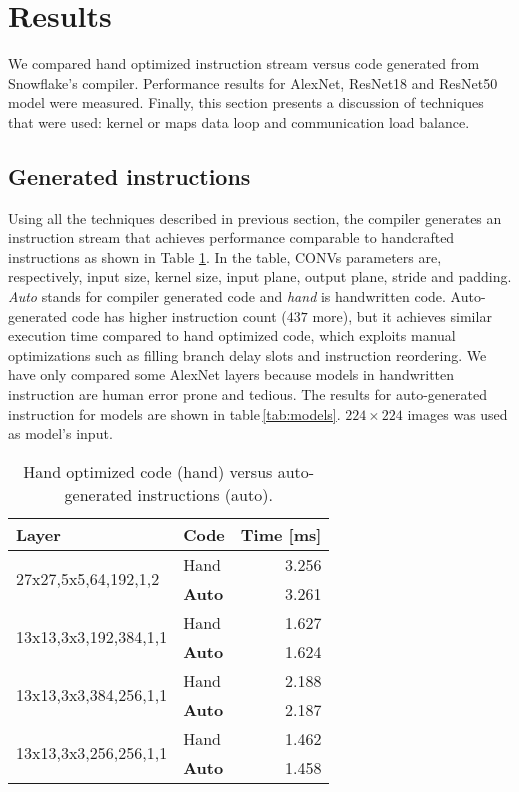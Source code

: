 \documentclass{sig-alternate}
\begin{document}
\section{Results}
We compared hand optimized instruction stream versus code generated from Snowflake's compiler. Performance results for AlexNet, ResNet18 and ResNet50 model were measured. Finally, this section presents a discussion of techniques that were used: kernel or maps data loop and communication load balance.

\subsection{Generated instructions}
Using all the techniques described in previous section, the compiler generates an instruction stream that achieves performance comparable to handcrafted instructions as shown in Table \ref{tab:hand}. In the table, CONVs parameters are, respectively, input size, kernel size, input plane, output plane, stride and padding. \emph{Auto} stands for compiler generated code and \emph{hand} is handwritten code. Auto-generated code has higher instruction count ($437$ more), but it achieves similar execution time compared to hand optimized code, which exploits manual optimizations such as filling branch delay slots and instruction reordering. We have only compared some AlexNet layers because models in handwritten instruction are human error prone and tedious. The results for auto-generated instruction for models are shown in table\,\ref{tab:models}. $224\times224$ images was used as model's input.

\begin{table}[h]
\centering
\caption{Hand optimized code (hand) versus auto-generated instructions (auto).}
\label{tab:hand}
\begin{tabular}{|l|l|r|}
\hline
Layer & Code & Time {[}ms{]} \\ \hline
\multirow{2}{*}{27x27,5x5,64,192,1,2} & Hand & 3.256 \\ \cline{2-3} 
 & \textbf{Auto} & 3.261  \\ \hline
\multirow{2}{*}{13x13,3x3,192,384,1,1} & Hand & 1.627  \\ \cline{2-3} 
 & \textbf{Auto} & 1.624  \\ \hline
\multirow{2}{*}{13x13,3x3,384,256,1,1} & Hand & 2.188\\ \cline{2-3} 
 & \textbf{Auto} & 2.187 \\ \hline
\multirow{2}{*}{13x13,3x3,256,256,1,1} & Hand & 1.462  \\ \cline{2-3} 
 & \textbf{Auto} & 1.458 \\ \hline
\end{tabular}
\end{table}
\end{document}
